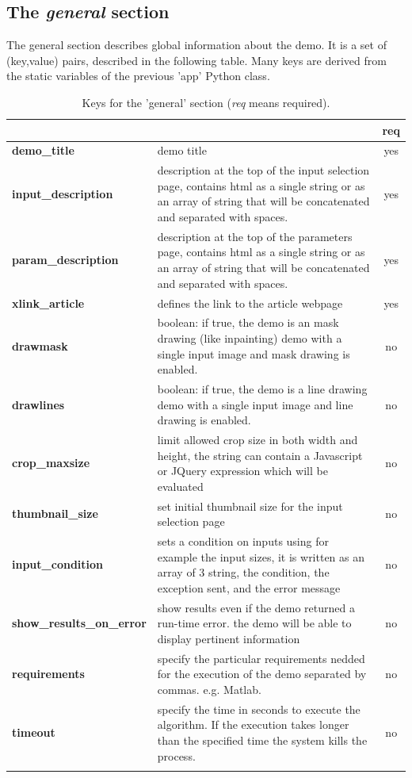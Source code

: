 \subsection{The \emph{general} section}
The general section describes global information about the demo.
It is a set of  (key,value) pairs, described in the following table.
Many keys are derived from the static variables of the previous 'app' Python class.\\
% 
\begin{longtable}{|>{\bf}L{\linewidth}|L{\linewidth}|c|}
\hline
      &  & {\bf req} 
\tabularnewline \hline \hline
 demo\_title         & demo title & yes\\ \hline
 input\_description  & description at the top of the input selection page, 
                      contains html as a single string or as an array of string
                      that will be concatenated and separated with spaces.
                     & yes \\ \hline
 param\_description  & description at the top of the para\-meters page,
                      contains html as a single string or as an array of string
                      that will be concatenated and separated with spaces.
                      & yes
                      \\ \hline
 xlink\_article     & defines the link to the article webpage & yes  \\ \hline
 drawmask           & boolean: if true, the demo is an mask drawing (like inpainting) demo with a 
                      single input image and mask drawing is enabled. & no \\ \hline
 drawlines          & boolean: if true, the demo is a line drawing demo with a 
                      single input image and line drawing is enabled. & no \\ \hline
 crop\_maxsize      & limit allowed crop size in both width and height, the string
                      can contain a Javascript or JQuery expression which will be evaluated & no \\ \hline
 thumbnail\_size    & set initial thumbnail size for the input selection page & no \\ \hline
 input\_condition   & sets a condition on inputs using for example the input sizes,
                      it is written as an array of 3 string, the condition,
                      the exception sent, and the error message& no \\ \hline
 show\_results\_on\-\_error & show results even if the demo returned a run-time error.
                    the demo will be able to display pertinent information & no \\ \hline
 requirements 	    & specify the particular requirements nedded for the execution of the demo separated by commas. e.g. Matlab. & no \\ \hline
 timeout 	    & specify the time in seconds to execute the algorithm. If the execution takes longer than the specified time 
		      the system kills the process.& no \\ \hline
\caption{Keys for the 'general' section ({\em req} means required).}
\end{longtable}

